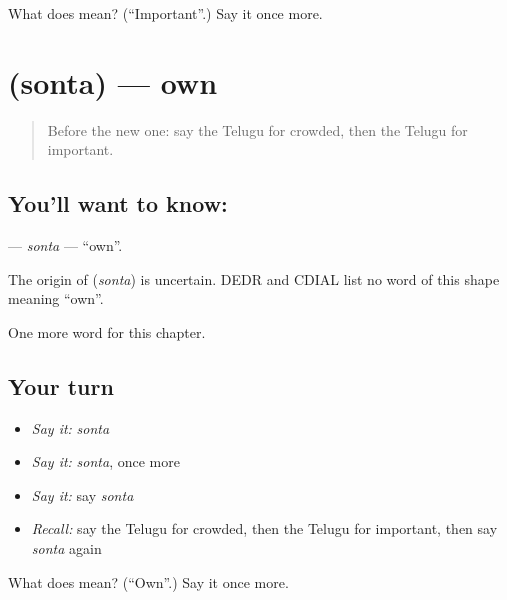 \begin{tcolorbox}[breakable,colback=teal!4,colframe=teal!35!black,title={Before you move on}]
What does  mean? (\textquotedblleft{}Important\textquotedblright{}.) Say it once more.
\end{tcolorbox}
\section[\texorpdfstring{\te{సొంత} (sonta)}{సొంత (sonta)}]{ (sonta) — own}

\label{lesson:TE-C259-sonta}



\begin{quote}
Before the new one: say the Telugu for crowded, then the Telugu for important.
\end{quote}

\subsection*{You'll want to know: }
\textbf{} — \emph{sonta} — \textquotedblleft{}own\textquotedblright{}.

\begin{cousinweb}
The origin of \textbf{} (\emph{sonta}) is uncertain. DEDR and CDIAL list no word of this shape meaning \textquotedblleft{}own\textquotedblright{}.
\end{cousinweb}

\begin{grammarlens}[title={What you've built}]
One more word for this chapter.
\end{grammarlens}

\subsection*{Your turn}
\begin{itemize}
\raggedright
  \item \emph{Say it:} \emph{sonta}
  \item \emph{Say it:} \emph{sonta}, once more
  \item \emph{Say it:} say \emph{sonta}
  \item \emph{Recall:} say the Telugu for crowded, then the Telugu for important, then say \emph{sonta} again
\end{itemize}

\begin{tcolorbox}[breakable,colback=teal!4,colframe=teal!35!black,title={Before you move on}]
What does  mean? (\textquotedblleft{}Own\textquotedblright{}.) Say it once more.
\end{tcolorbox}
